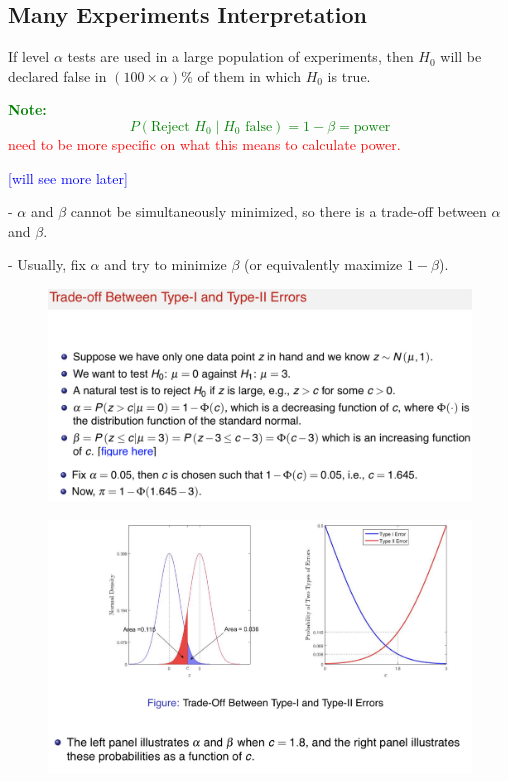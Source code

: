 \documentclass[14pt]{extarticle}
\begin{document}
\subsection*{Many Experiments Interpretation}

If level \( \alpha \) tests are used in a large population of experiments, then \( H_0 \) will be declared false in \( (100 \times \alpha) \% \) of them in which \( H_0 \) is true.

\noindent   \textcolor{green}{\textbf{Note:}
\[
P(\text{Reject } H_0 \mid H_0 \text{ false}) = 1 - \beta = \text{power}
\]}
\textcolor{red}{need to be more specific on what this means to calculate power.}

\textcolor{blue}{[will see more later]}

\noindent - \( \alpha \) and \( \beta \) cannot be simultaneously minimized, so there is a trade-off between \( \alpha \) and \( \beta \).

\noindent - Usually, fix \( \alpha \) and try to minimize \( \beta \) (or equivalently maximize \( 1 - \beta \)).
\begin{figure}[H]
    \centering
    \includegraphics[width=1\textwidth]{fig4.png}
\end{figure}

\begin{figure}[H]
    \centering
    \includegraphics[width=1\textwidth]{fig5.png}
\end{figure}
\end{document}
